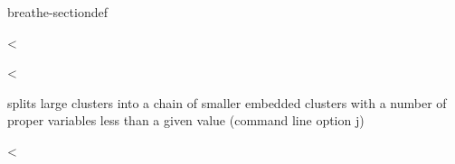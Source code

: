 \documentclass[letterpaper,10pt,openany,oneside,english]{sphinxmanual}
\begin{document}
\begin{fulllineitems}
\begin{sphinxuseclass}{breathe-sectiondef}
\begin{fulllineitems}
\label{\detokenize{ref/ref_cpp:_CPPv4N8ToulBar219splitClusterMaxSizeE}}\label{\detokenize{ref/ref_cpp:_CPPv3N8ToulBar219splitClusterMaxSizeE}}\label{\detokenize{ref/ref_cpp:_CPPv2N8ToulBar219splitClusterMaxSizeE}}\label{\detokenize{ref/ref_cpp:ToulBar2::splitClusterMaxSize__i}}
\pysigstartsignatures
\pysigstartmultiline
{}
\pysigstopmultiline
\pysigstopsignatures
\sphinxAtStartPar
\textless{} 

\end{fulllineitems}


\begin{fulllineitems}
\label{\detokenize{ref/ref_cpp:_CPPv4N8ToulBar211boostingBTDE}}\label{\detokenize{ref/ref_cpp:_CPPv3N8ToulBar211boostingBTDE}}\label{\detokenize{ref/ref_cpp:_CPPv2N8ToulBar211boostingBTDE}}\label{\detokenize{ref/ref_cpp:ToulBar2::boostingBTD__double}}
\pysigstartsignatures
\pysigstartmultiline
{}
\pysigstopmultiline
\pysigstopsignatures
\sphinxAtStartPar
\textless{} 

\sphinxAtStartPar
splits large clusters into a chain of smaller embedded clusters with a number of proper variables less than a given value (command line option \sphinxhyphen{}j) 

\end{fulllineitems}


\begin{fulllineitems}
\label{\detokenize{ref/ref_cpp:_CPPv4N8ToulBar216maxSeparatorSizeE}}\label{\detokenize{ref/ref_cpp:_CPPv3N8ToulBar216maxSeparatorSizeE}}\label{\detokenize{ref/ref_cpp:_CPPv2N8ToulBar216maxSeparatorSizeE}}\label{\detokenize{ref/ref_cpp:ToulBar2::maxSeparatorSize__i}}
\pysigstartsignatures
\pysigstartmultiline
{}
\pysigstopmultiline
\pysigstopsignatures
\sphinxAtStartPar
\textless{} 


\end{fulllineitems}
\end{sphinxuseclass}
\end{fulllineitems}
\end{document}
